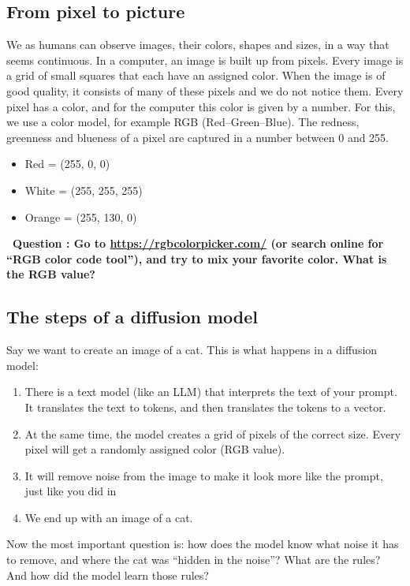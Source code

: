 \documentclass[12pt]{article}
\newcounter{question}
\newcommand{\question}[2][5cm]{%
  \stepcounter{question}
  \vspace{0.3cm}
  \textbf{\faEdit\ Question \thequestion: #2} \\[0.3em]
  
  \begin{Form}
  \TextField[
    name=Q\thequestion,
    multiline=true,
    width=\linewidth,
    height=#1,
    charsize=10pt,
    bordercolor={0 0 0},
    borderwidth=1.8,
    backgroundcolor={1 1 1}
  ]{}
  \end{Form}
  
  \vspace{0.3cm}
}
\begin{document}
\subsection{From pixel to picture}

We as humans can observe images, their colors, shapes and sizes, in a way that seems continuous. In a computer, an image is built up from pixels. Every image is a grid of small squares that each have an assigned color. When the image is of good quality, it consists of many of these pixels and we do not notice them. Every pixel has a color, and for the computer this color is given by a number. For this, we use a color model, for example RGB (Red--Green--Blue). The redness, greenness and blueness of a pixel are captured in a number between 0 and 255.

\begin{itemize}
  \item Red = (255, 0, 0)
  \item White = (255, 255, 255)
  \item Orange = (255, 130, 0)
\end{itemize}

\question[5\baselineskip]{Go to \url{https://rgbcolorpicker.com/} (or search online for ``RGB color code tool''), and try to mix your favorite color. What is the RGB value?}


\subsection{The steps of a diffusion model}
Say we want to create an image of a cat. This is what happens in a diffusion model:
\begin{enumerate}
  \item There is a text model (like an LLM) that interprets the text of your prompt. It translates the text to tokens, and then translates the tokens to a vector.
  \item At the same time, the model creates a grid of pixels of the correct size. Every pixel will get a randomly assigned color (RGB value).
  \item It will remove noise from the image to make it look more like the prompt, just like you did in 
  \item We end up with an image of a cat.
\end{enumerate}

Now the most important question is: how does the model know what noise it has to remove, and where the cat was ``hidden in the noise''? What are the rules? And how did the model learn those rules?
\end{document}
